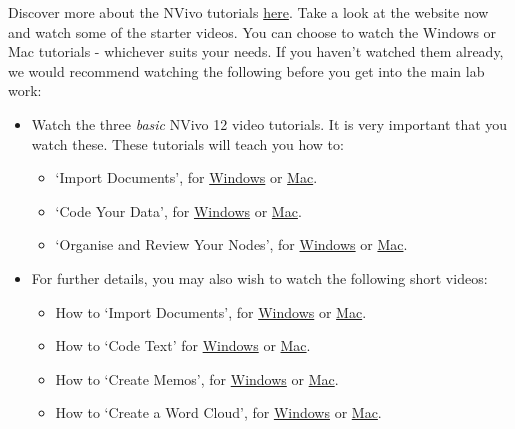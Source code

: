\documentclass[
]{book}
\providecommand{\tightlist}{%
  \setlength{\itemsep}{0pt}\setlength{\parskip}{0pt}}
\begin{document}
Discover more about the NVivo tutorials \href{https://www.qsrinternational.com/nvivo/free-nvivo-resources/tutorials}{here}. Take a look at the website now and watch some of the starter videos. You can choose to watch the Windows or Mac tutorials - whichever suits your needs. If you haven't watched them already, we would recommend watching the following before you get into the main lab work:

\begin{itemize}
\tightlist
\item
  Watch the three \emph{basic} NVivo 12 video tutorials. It is very important that you watch these. These tutorials will teach you how to:

  \begin{itemize}
  \tightlist
  \item
    `Import Documents', for \href{https://www.youtube.com/watch?v=QN6AAKmZvIo}{Windows} or \href{https://www.youtube.com/watch?v=I7tJpX2ixDI}{Mac}.
  \item
    `Code Your Data', for \href{https://www.youtube.com/watch?v=vVEyhibQGog}{Windows} or \href{https://www.youtube.com/watch?v=J-EZlNTZDrw}{Mac}.
  \item
    `Organise and Review Your Nodes', for \href{https://www.youtube.com/watch?v=KEo3nt5GL7Y\&t=2s}{Windows} or \href{https://www.youtube.com/watch?v=p5ugfM6caBE}{Mac}.
  \end{itemize}
\item
  For further details, you may also wish to watch the following short videos:

  \begin{itemize}
  \tightlist
  \item
    How to `Import Documents', for \href{https://www.youtube.com/watch?v=NjTIYXTsYSE}{Windows} or \href{https://www.youtube.com/watch?v=TmkqvFXKwo4}{Mac}.
  \item
    How to `Code Text' for \href{https://www.youtube.com/watch?v=7v59gwQ2LUY}{Windows} or \href{https://www.youtube.com/watch?v=nxYT0J6lbDU}{Mac}.
  \item
    How to `Create Memos', for \href{https://www.youtube.com/watch?v=Gks-AtrMLlI}{Windows} or \href{https://www.youtube.com/watch?v=_tSQZBZeAUc}{Mac}.
  \item
    How to `Create a Word Cloud', for \href{https://www.youtube.com/watch?v=Rx-8eY_z6lQ}{Windows} or \href{https://www.youtube.com/watch?v=mEVyV19D0fY}{Mac}.
  \end{itemize}
\end{itemize}
\end{document}
